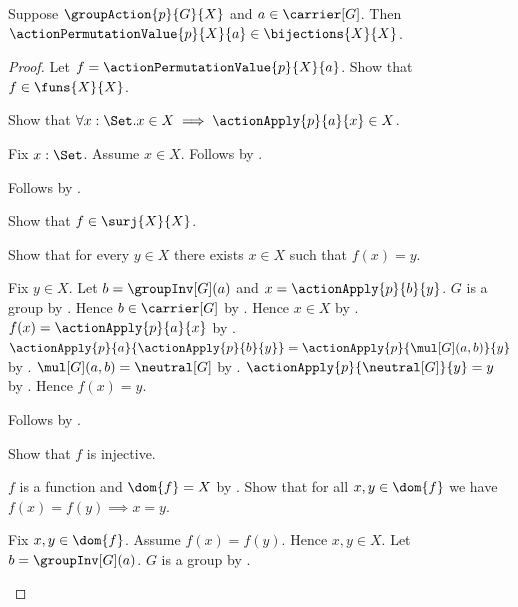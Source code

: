 \begin{theorem}\label{action_permutation_value_bijection}
    Suppose $\groupAction{p}{G}{X}$ and $a\in\carrier[G]$.
    Then $\actionPermutationValue{p}{X}{a}\in\bijections{X}{X}$.
\end{theorem}
\begin{proof}
    Let $f=\actionPermutationValue{p}{X}{a}$.
    Show that $f\in\funs{X}{X}$.
    \begin{subproof}
        Show that $\forall x:\Set. x\in X\implies
            \actionApply{p}{a}{x}\in X$.
        \begin{subproof}
            Fix $x:\Set$.
            Assume $x\in X$.
            Follows by .
        \end{subproof}
        Follows by
            .
    \end{subproof}
    Show that $f\in\surj{X}{X}$.
    \begin{subproof}
        Show that for every $y\in X$ there exists $x\in X$ such that
            $f(x)=y$.
        \begin{subproof}
            Fix $y\in X$.
            Let $b=\groupInv[G](a)$ and
                $x=\actionApply{p}{b}{y}$.
            $G$ is a group by .
            Hence $b\in\carrier[G]$ by .
            Hence $x\in X$ by .
            $f(x)=\actionApply{p}{a}{x}$ by
                .
            $\actionApply{p}{a}{\actionApply{p}{b}{y}}=
                \actionApply{p}{\mul[G](a,b)}{y}$ by
                .
            $\mul[G](a,b)=\neutral[G]$ by
                .
            $\actionApply{p}{\neutral[G]}{y}=y$ by
                .
            Hence $f(x)=y$.
        \end{subproof}
        Follows by .
    \end{subproof}
    Show that $f$ is injective.
    \begin{subproof}
        $f$ is a function and $\dom{f}=X$ by .
        Show that for all $x,y\in\dom{f}$ we have
            $f(x)=f(y)\implies x=y$.
        \begin{subproof}
            Fix $x,y\in\dom{f}$.
            Assume $f(x)=f(y)$.
            Hence $x,y\in X$.
            Let $b=\groupInv[G](a)$.
            $G$ is a group by .

\end{subproof}
\end{subproof}
\end{proof}
